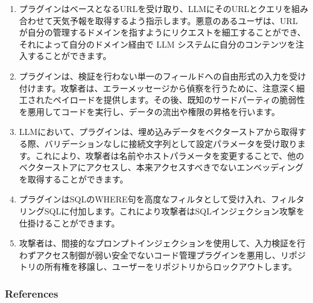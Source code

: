 \documentclass[
]{article}
\providecommand{\tightlist}{%
  \setlength{\itemsep}{0pt}\setlength{\parskip}{0pt}}
\begin{document}
\begin{enumerate}
\def\labelenumi{\arabic{enumi}.}
\tightlist
\item
  プラグインはベースとなるURLを受け取り、LLMにそのURLとクエリを組み合わせて天気予報を取得するよう指示します。悪意のあるユーザは、URL
  が自分の管理するドメインを指すようにリクエストを細工することができ、それによって自分のドメイン経由で
  LLM システムに自分のコンテンツを注入することができます。
\item
  プラグインは、検証を行わない単一のフィールドへの自由形式の入力を受け付けます。攻撃者は、エラーメッセージから偵察を行うために、注意深く細工されたペイロードを提供します。その後、既知のサードパーティの脆弱性を悪用してコードを実行し、データの流出や権限の昇格を行います。
\item
  LLMにおいて、プラグインは、埋め込みデータをベクターストアから取得する際、バリデーションなしに接続文字列として設定パラメータを受け取ります。これにより、攻撃者は名前やホストパラメータを変更することで、他のベクターストアにアクセスし、本来アクセスすべきでないエンベッディングを取得することができます。
\item
  プラグインはSQLのWHERE句を高度なフィルタとして受け入れ、フィルタリングSQLに付加します。これにより攻撃者はSQLインジェクション攻撃を仕掛けることができます。
\item
  攻撃者は、間接的なプロンプトインジェクションを使用して、入力検証を行わずアクセス制御が弱い安全でないコード管理プラグインを悪用し、リポジトリの所有権を移譲し、ユーザーをリポジトリからロックアウトします。
\end{enumerate}

\subsubsection{References}\label{references}
\end{document}
